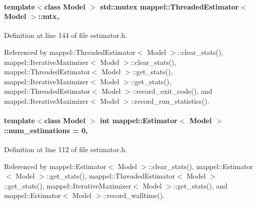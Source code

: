 \paragraph[{\texorpdfstring{mtx}{mtx}}]{\setlength{\rightskip}{0pt plus 5cm}template$<$class Model $>$ std\+::mutex {\bf mappel\+::\+Threaded\+Estimator}$<$ Model $>$\+::mtx\hspace{0.3cm}{\ttfamily [protected]}, {\ttfamily [inherited]}}\hypertarget{classmappel_1_1ThreadedEstimator_a4538fd0860243430bfd47e8064c8cfe4}{}\label{classmappel_1_1ThreadedEstimator_a4538fd0860243430bfd47e8064c8cfe4}


Definition at line 144 of file estimator.\+h.



Referenced by mappel\+::\+Threaded\+Estimator$<$ Model $>$\+::clear\+\_\+stats(), mappel\+::\+Iterative\+Maximizer$<$ Model $>$\+::clear\+\_\+stats(), mappel\+::\+Threaded\+Estimator$<$ Model $>$\+::get\+\_\+stats(), mappel\+::\+Iterative\+Maximizer$<$ Model $>$\+::get\+\_\+stats(), mappel\+::\+Threaded\+Estimator$<$ Model $>$\+::record\+\_\+exit\+\_\+code(), and mappel\+::\+Iterative\+Maximizer$<$ Model $>$\+::record\+\_\+run\+\_\+statistics().

\paragraph[{\texorpdfstring{num\+\_\+estimations}{num_estimations}}]{\setlength{\rightskip}{0pt plus 5cm}template$<$class Model $>$ int {\bf mappel\+::\+Estimator}$<$ Model $>$\+::num\+\_\+estimations = 0\hspace{0.3cm}{\ttfamily [protected]}, {\ttfamily [inherited]}}\hypertarget{classmappel_1_1Estimator_ab15b88435d6c50a68fac84465d950b12}{}\label{classmappel_1_1Estimator_ab15b88435d6c50a68fac84465d950b12}


Definition at line 112 of file estimator.\+h.



Referenced by mappel\+::\+Estimator$<$ Model $>$\+::clear\+\_\+stats(), mappel\+::\+Estimator$<$ Model $>$\+::get\+\_\+stats(), mappel\+::\+Threaded\+Estimator$<$ Model $>$\+::get\+\_\+stats(), mappel\+::\+Iterative\+Maximizer$<$ Model $>$\+::get\+\_\+stats(), and mappel\+::\+Estimator$<$ Model $>$\+::record\+\_\+walltime().

